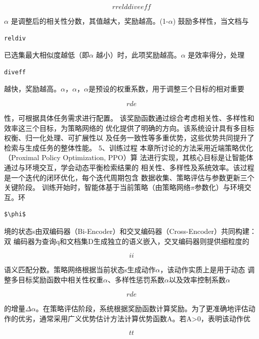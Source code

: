 \documentclass[12pt,a4paper,openright,UTF8]{ctexbook}
\begin{document}
\begin{equation*}
rrelddiveeff
\end{equation*}

$\alpha$ 是调整后的相关性分数，其值越大，奖励越高。(1-$\alpha$) 鼓励多样性，当文档与

\begin{lstlisting}
reldiv
\end{lstlisting}
已选集最大相似度越低（即$\alpha$ 越小）时，此项奖励越高。$\alpha$ 是效率得分，处理

\begin{lstlisting}
diveff
\end{lstlisting}
越快，奖励越高。$\alpha$，$\alpha$，$\alpha$是预设的权重系数，用于调整三个目标的相对重要

\begin{equation*}
rde
\end{equation*}

性，可根据具体任务需求进行配置。 该奖励函数通过综合考虑相关性、多样性和效率这三个目标，为策略网络的 优化提供了明确的方向。该系统设计具有多目标权衡、归一化处理、可扩展性以 及任务一致性等多重优势，这些优势共同提升了检索与生成任务的整体性能。 5、训练过程 本章所讨论的方法采用近端策略优化（Proximal Policy Optimization, PPO）算 法进行实现，其核心目标是让智能体通过与环境交互，学会动态平衡检索结果的 相关性、多样性及系统效率。该过程是一个迭代的闭环优化，每个迭代周期包含 数据收集、策略评估与参数更新三个关键阶段。 训练开始时，智能体基于当前策略（由策略网络$\pi$参数化）与环境交互。环

\begin{lstlisting}
$\phi$
\end{lstlisting}
境的状态s由双编码器（Bi-Encoder）和交叉编码器（Cross-Encoder）共同构建：双 编码器为查询q和文档集D生成独立的语义嵌入，交叉编码器则提供细粒度的

\begin{equation*}
ii
\end{equation*}

语义匹配分数。策略网络根据当前状态s生成动作$\alpha$，该动作实质上是用于动态 调整多目标奖励函数中相关性权重$\alpha$、多样性惩罚系数$\alpha$以及效率控制系数$\alpha$

\begin{equation*}
rde
\end{equation*}

的增量$\Delta$$\alpha$。在策略评估阶段，系统根据奖励函数计算奖励。为了更准确地评估动 作的优劣，通常采用广义优势估计方法计算优势函数A。若A>0，表明该动作优

\begin{equation*}
tt
\end{equation*}
\end{document}
